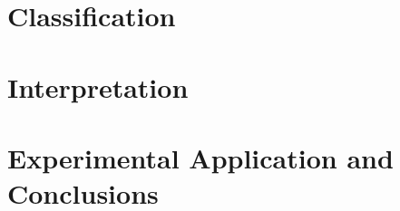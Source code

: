 \documentclass[
11pt, %
english, %
singlespacing, %
headsepline, %
]{MastersDoctoralThesis} %
\theoremstyle{definition}
\theoremstyle{definition} %
\theoremstyle{remark}
\begin{document}
\part{Classification}



 
\part{Interpretation}
 

\part{Experimental Application and Conclusions} 

 




%
%
%


\printbibliography[heading=bibintoc]



\end{document}
